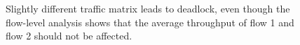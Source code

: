 \begin{figure}[t]
\centering

\vspace{-0.15in}
\caption{Slightly different traffic matrix leads to deadlock, even though
the flow-level analysis shows that the average throughput of flow 1 and flow 2 should not be affected.
}
\vspace{-0.2in}
\label{fig:case2}
\end{figure}


